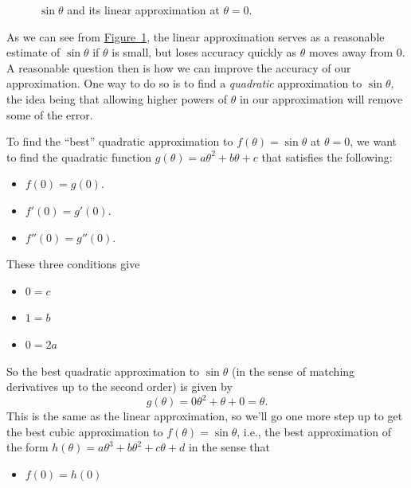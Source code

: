 \documentclass[10pt,]{book}
\numberwithin{equation}{section}
\begin{document}
\begin{introduction}{}
\begin{figure}
{
}
\caption{\(\sin\theta\) and its linear approximation at \(\theta=0\).\label{figure-sine-linear-approximation}}
\end{figure}
\hypertarget{p-779}{}%
As we can see from \hyperref[figure-sine-linear-approximation]{Figure~\ref{figure-sine-linear-approximation}}, the linear approximation serves as a reasonable estimate of \(\sin\theta\) if \(\theta\) is small, but loses accuracy quickly as \(\theta\) moves away from \(0\). A reasonable question then is how we can improve the accuracy of our approximation. One way to do so is to find a \emph{quadratic} approximation to \(\sin\theta\), the idea being that allowing higher powers of \(\theta\) in our approximation will remove some of the error.%
\par
\hypertarget{p-780}{}%
To find the ``best'' quadratic approximation to \(f(\theta) = \sin\theta\) at \(\theta = 0\), we want to find the quadratic function \(g(\theta) = a\theta^{2} + b\theta + c\) that satisfies the following:%
\leavevmode%
\begin{itemize}[label=\textbullet]
\item{}\(f(0) = g(0).\)%
\item{}\(f'(0) = g'(0).\)%
\item{}\(f''(0) = g''(0).\)%
\end{itemize}
\hypertarget{p-781}{}%
These three conditions give%
\leavevmode%
\begin{itemize}[label=\textbullet]
\item{}\(0 = c\)%
\item{}\(1 = b\)%
\item{}\(0 = 2a\)%
\end{itemize}
\hypertarget{p-782}{}%
So the best quadratic approximation to \(\sin\theta\) (in the sense of matching derivatives up to the second order) is given by%
\begin{equation*}
g(\theta) = 0\theta^{2} + \theta + 0 = \theta.
\end{equation*}
This is the same as the linear approximation, so we'll go one more step up to get the best cubic approximation to \(f(\theta) = \sin\theta\), i.e.\@, the best approximation of the form \(h(\theta) = a\theta^{3} + b\theta^{2} + c\theta + d\) in the sense that%
\leavevmode%
\begin{itemize}[label=\textbullet]
\item{}\(f(0) = h(0)\)%

\end{itemize}
\end{introduction}
\end{document}
